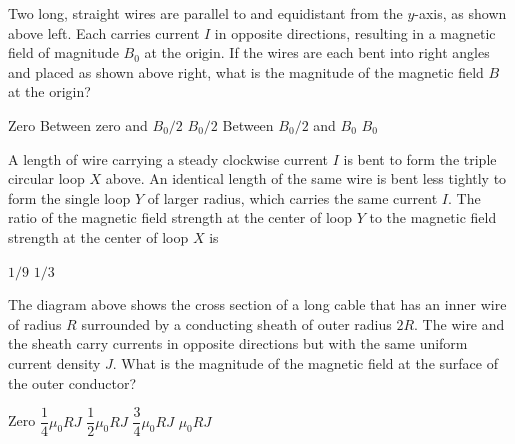 \documentclass[12pt]{../oss-classkick-exam}
\begin{document}
\begin{questions}
  \question Two long, straight wires are parallel to and equidistant from the
  $y$-axis, as shown above left. Each carries current $I$ in opposite
  directions, resulting in a magnetic field of magnitude $B_0$ at the origin.
  If the wires are each bent into right angles and placed as shown above right,
  what is the magnitude of the magnetic field $B$ at the origin?
  \begin{choices}
    \choice Zero
    \choice Between zero and $B_0/2$
    \choice $B_0/2$
    \choice Between $B_0/2$ and $B_0$
    \choice $B_0$
    \end{choices}


  \question A length of wire carrying a steady clockwise current $I$ is bent
  to form the triple circular loop $X$ above. An identical length of the same
  wire is bent less tightly to form the single loop $Y$ of larger radius, which
  carries the same current $I$. The ratio of the magnetic field strength at the
  center of loop $Y$ to the magnetic field strength at the center of loop $X$ is
  \begin{choices}
    \choice $1/9$
    \choice $1/3$
  \end{choices}
  \newpage
  
  \question The diagram above shows the cross section of a long cable that has
  an inner wire of radius $R$ surrounded by a conducting sheath of outer radius
  $2R$. The wire and the sheath carry currents in opposite directions but with
  the same uniform current density $J$. What is the magnitude of the magnetic
  field at the surface of the outer conductor?
  \begin{choices}
    \choice Zero
    \choice $\dfrac14\mu_0RJ$
    \choice $\dfrac12\mu_0RJ$
    \choice $\dfrac34\mu_0RJ$
    \choice $\mu_0RJ$
  \end{choices}


\end{questions}
\end{document}
